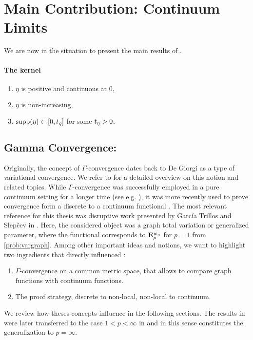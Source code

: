 \section{Main Contribution: Continuum Limits}\label{sec:ContLim}
%
We are now in the situation to present the main results of \cite{roith2022continuum, bungert2022ratio}. 
%
%
%
%
\paragraph{The kernel}

\begin{enumerate}[label=(K\upshape\arabic*)]
\item\label{en:K1} $\eta$ is positive and continuous at $0$,
\item\label{en:K2} $\eta$ is non-increasing,
\item\label{en:K4} $\mathrm{supp}(\eta) \subset [0,t_\eta]$ for some $t_\eta>0$.
\end{enumerate}
%
%
%
\subsection{Gamma Convergence: \cite{roith2022continuum}}\label{sec:GConv}
%
%
Originally, the concept of $\Gamma$-convergence dates back to De Giorgi \cite{de1975tipo} as a type of variational convergence. We refer to \cite{Brad02, dal2012introduction} for a detailed overview on this notion and related topics. While $\Gamma$-convergence was successfully employed in a pure continuum setting for a longer time (see e.g. \cite{modica1977esempio}), it was more recently used to prove convergence form a discrete to a continuum functional \cite{chambolle2010continuous, braides2012quantitative, van2012gamma}. The most relevant reference for this thesis was disruptive work presented by Garc\'ia Trillos and Slep\v{c}ev in \cite{GarcSlep15}. Here, the considered object was a graph total variation or generalized parameter, where the functional corresponds to $\mathbf{E}^{w_n}_p$ for $p=1$ from \cref{prob:vargraph}. Among other important ideas and notions, we want to highlight two ingredients that directly influenced \cite{roith2022continuum}:
%
\begin{enumerate}[label=\arabic*)]
\item $\Gamma$-convergence on a common metric space, that allows to compare graph functions with continuum functions.
\item The proof strategy, discrete to non-local, non-local to continuum.
\end{enumerate}
%
%
We review how theses concepts influence \cite{roith2022continuum} in the following sections. The results in \cite{GarcSlep15} were later transferred to the case $1<p<\infty$ in \cite{slepcev2019analysis} and in this sense \cite{roith2022continuum} constitutes the generalization to $p=\infty$. 
%
%
